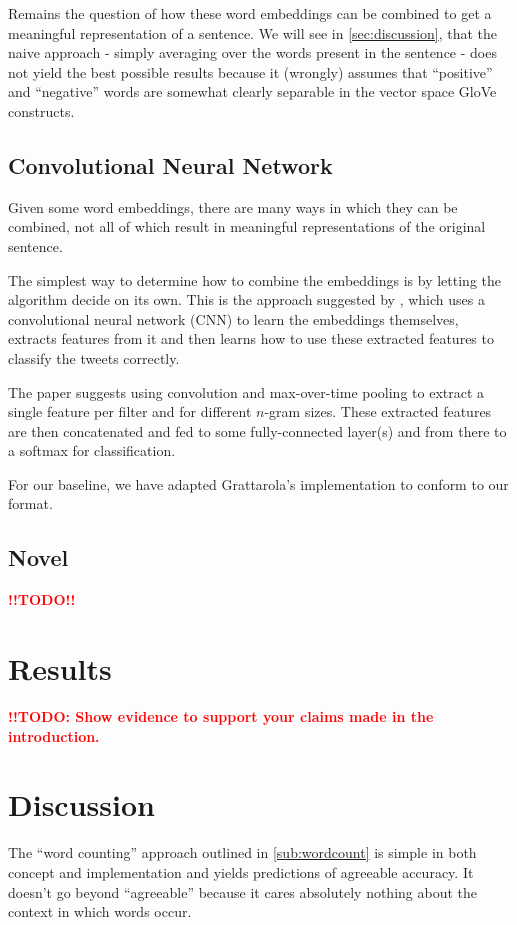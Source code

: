 \documentclass[10pt,conference,compsocconf]{IEEEtran}
\newcommand{\todo}{\textcolor{red}{\textbf{!!TODO!!}}}
\newcommand{\todoThis}[1]{\textcolor{red}{\textbf{!!TODO: #1}}}
\begin{document}
Remains the question of how these word embeddings can be combined to get a meaningful representation of a sentence. We will see in \autoref{sec:discussion}, that the naive approach - simply averaging over the words present in the sentence - does not yield the best possible results because it (wrongly) assumes that ``positive'' and ``negative'' words are somewhat clearly separable in the vector space GloVe constructs.

\subsection{Convolutional Neural Network}\label{sub:cnn}
Given some word embeddings, there are many ways in which they can be combined, not all of which result in meaningful representations of the original sentence.

The simplest way to determine how to combine the embeddings is by letting the algorithm decide on its own. This is the approach suggested by \cite{cnn_paper}, which uses a convolutional neural network (CNN) to learn the embeddings themselves, extracts features from it and then learns  how to use these extracted features to classify the tweets correctly.

The paper suggests using convolution and max-over-time pooling to extract a single feature per filter and for different $n$-gram sizes. These extracted features are then concatenated and fed to some fully-connected layer(s) and from there to a softmax for classification.

For our baseline, we have adapted Grattarola's implementation \cite{cnn_base} to conform to our format.

\subsection{Novel}\label{sub:novel}
\todo

\section{Results}\label{sec:results}
\todoThis{Show evidence to support your claims made in the
  introduction.}
  
\section{Discussion}\label{sec:discussion}
The ``word counting'' approach outlined in \autoref{sub:wordcount} is simple in both concept and implementation and yields predictions of agreeable accuracy. It doesn't go beyond ``agreeable'' because it cares absolutely nothing about the context in which words occur.
\end{document}
